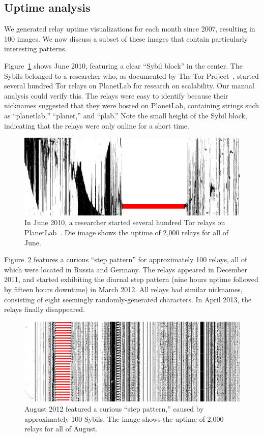 \subsection{Uptime analysis}
\label{sec:uptime}
We generated relay uptime visualizations for each month since 2007, resulting in
100 images.  We now discuss a subset of these images that contain particularly
interesting patterns.

Figure~\ref{fig:2010-06-planetlab} shows June 2010, featuring a clear ``Sybil
block'' in the center.  The Sybils belonged to a researcher who, as documented
by The Tor Project~\cite{progressreport}, started several hundred Tor relays on
PlanetLab for research on scalability.  Our manual analysis could verify this.
The relays were easy to identify because their nicknames suggested that they
were hosted on PlanetLab, containing strings such as ``planetlab,'' ``planet,''
and ``plab.''  Note the small height of the Sybil block, indicating that the
relays were only online for a short time.

\begin{figure}[t]
	\centering
	\includegraphics[width=\linewidth]{diagrams/2010-06.jpg}
	\caption{In June 2010, a researcher started several hundred Tor relays on
		PlanetLab~\cite{progressreport}.  Die image shows the uptime of 2,000
		relays for all of June.}
	\label{fig:2010-06-planetlab}
\end{figure}

Figure~\ref{fig:2012-08-steppattern} features a curious ``step pattern'' for
approximately 100 relays, all of which were located in Russia and Germany.  The
relays appeared in December 2011, and started exhibiting the diurnal step
pattern (nine hours uptime followed by fifteen hours downtime) in March 2012.
All relays had similar nicknames, consisting of eight seemingly
randomly-generated characters.  In April 2013, the relays finally disappeared.

\begin{figure}[t]
	\centering
	\includegraphics[width=\linewidth]{diagrams/2012-08.jpg}
	\caption{August 2012 featured a curious ``step pattern,'' caused by
	approximately 100 Sybils.  The image shows the uptime of 2,000 relays for
	all of August.}
	\label{fig:2012-08-steppattern}
\end{figure}


